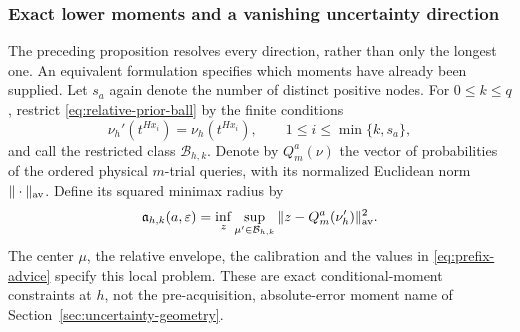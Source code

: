 \subsubsection{Exact lower moments and a vanishing uncertainty direction}
The preceding proposition resolves every direction, rather than only
the longest one. An equivalent formulation specifies which moments have
already been supplied. Let $s_a$ again denote the number of distinct
positive nodes. For $0\le k\le q$, restrict
\eqref{eq:relative-prior-ball} by the finite conditions
\begin{equation}\label{eq:prefix-advice}
 \nu_h'(t^{Hx_i})=\nu_h(t^{Hx_i}),
                 \qquad 1\le i\le\min\{k,s_a\},
\end{equation}
and call the restricted class $\mathcal B_{h,k}$. Denote by
$Q_m^a(\nu)$ the vector of probabilities of the ordered physical
$m$-trial queries, with its normalized Euclidean norm $\|\cdot\|_{\rm av}$.
Define its squared minimax radius by
\[
 \mathfrak a_{h,k}(a,\varepsilon)=
 \inf_z\sup_{\mu'\in\mathcal B_{h,k}}
       \|z-Q_m^a(\nu_h')\|_{\rm av}^2.
\]
The center $\mu$, the relative envelope, the calibration and the values
in \eqref{eq:prefix-advice} specify this local problem. These are exact
conditional-moment constraints at $h$, not the pre-acquisition,
absolute-error moment name of Section~\ref{sec:uncertainty-geometry}.

